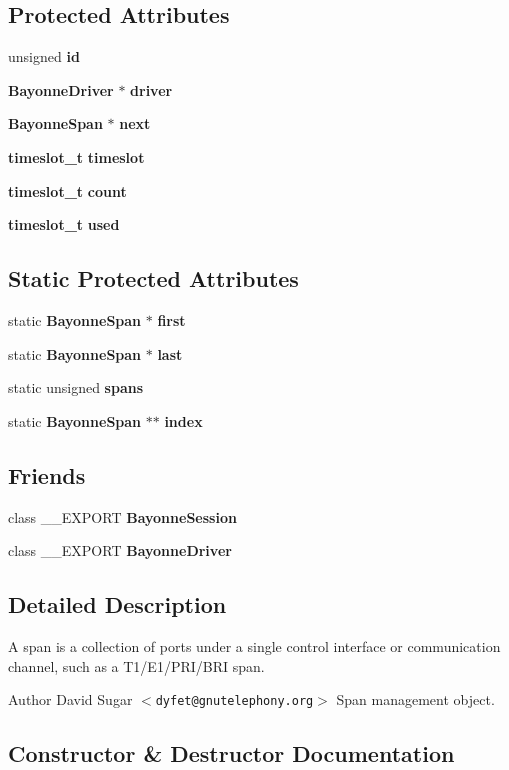 \subsection*{Protected Attributes}
\begin{DoxyCompactItemize}
\item 
unsigned {\bf id}
\item 
{\bf BayonneDriver} $\ast$ {\bf driver}
\item 
{\bf BayonneSpan} $\ast$ {\bf next}
\item 
{\bf timeslot\_\-t} {\bf timeslot}
\item 
{\bf timeslot\_\-t} {\bf count}
\item 
{\bf timeslot\_\-t} {\bf used}
\end{DoxyCompactItemize}
\subsection*{Static Protected Attributes}
\begin{DoxyCompactItemize}
\item 
static {\bf BayonneSpan} $\ast$ {\bf first}
\item 
static {\bf BayonneSpan} $\ast$ {\bf last}
\item 
static unsigned {\bf spans}
\item 
static {\bf BayonneSpan} $\ast$$\ast$ {\bf index}
\end{DoxyCompactItemize}
\subsection*{Friends}
\begin{DoxyCompactItemize}
\item 
class \_\-\_\-EXPORT {\bf BayonneSession}
\item 
class \_\-\_\-EXPORT {\bf BayonneDriver}
\end{DoxyCompactItemize}


\subsection{Detailed Description}
A span is a collection of ports under a single control interface or communication channel, such as a T1/E1/PRI/BRI span. \begin{DoxyAuthor}{Author}
David Sugar $<${\tt dyfet@gnutelephony.org}$>$ Span management object. 
\end{DoxyAuthor}


\subsection{Constructor \& Destructor Documentation}
